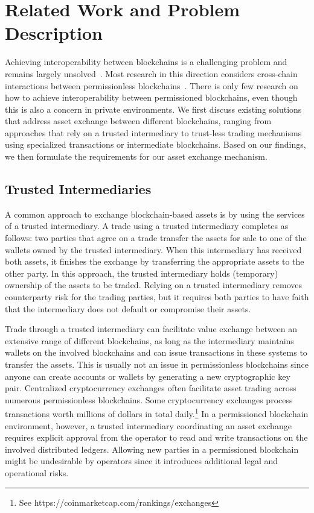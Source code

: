 \section{Related Work and Problem Description}
\label{sec:background_problem_description}
Achieving interoperability between blockchains is a challenging problem and remains largely unsolved~\cite{zamyatin2019sok,vo2018internet,buterin2016chain}.
Most research in this direction considers cross-chain interactions between permissionless blockchains~\cite{koens2019assessing}.
There is only few research on how to achieve interoperability between permissioned blockchains, even though this is also a concern in private environments.
We first discuss existing solutions that address asset exchange between different blockchains, ranging from approaches that rely on a trusted intermediary to trust-less trading mechanisms using specialized transactions or intermediate blockchains.
Based on our findings, we then formulate the requirements for our asset exchange mechanism.

\subsection{Trusted Intermediaries}
A common approach to exchange blockchain-based assets is by using the services of a trusted intermediary.
A trade using a trusted intermediary completes as follows: two parties that agree on a trade transfer the assets for sale to one of the wallets owned by the trusted intermediary.
When this intermediary has received both assets, it finishes the exchange by transferring the appropriate assets to the other party.
In this approach, the trusted intermediary holds (temporary) ownership of the assets to be traded.
Relying on a trusted intermediary removes counterparty risk for the trading parties, but it requires both parties to have faith that the intermediary does not default or compromise their assets.

Trade through a trusted intermediary can facilitate value exchange between an extensive range of different blockchains, as long as the intermediary maintains wallets on the involved blockchains and can issue transactions in these systems to transfer the assets.
This is usually not an issue in permissionless blockchains since anyone can create accounts or wallets by generating a new cryptographic key pair.
Centralized cryptocurrency exchanges often facilitate asset trading across numerous permissionless blockchains.
Some cryptocurrency exchanges process transactions worth millions of dollars in total daily.\footnote{See https://coinmarketcap.com/rankings/exchanges}
In a permissioned blockchain environment, however, a trusted intermediary coordinating an asset exchange requires explicit approval from the operator to read and write transactions on the involved distributed ledgers.
Allowing new parties in a permissioned blockchain might be undesirable by operators since it introduces additional legal and operational risks.

